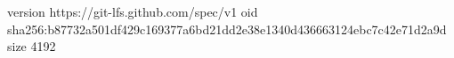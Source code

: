 version https://git-lfs.github.com/spec/v1
oid sha256:b87732a501df429c169377a6bd21dd2e38e1340d436663124ebc7c42e71d2a9d
size 4192
